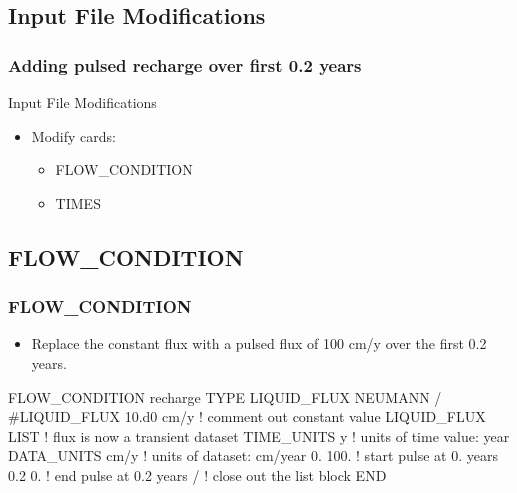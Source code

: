 \documentclass{beamer}
\newcommand\redcomment[1]{{{\color{red} #1}}}
\newcommand\bluecomment[1]{{{\color{blue} #1}}}
\newcommand\magentacomment[1]{{{\color{magenta} #1}}}
\begin{document}
\subsection{Input File Modifications}

\begin{frame}[fragile]\frametitle{Adding pulsed recharge over first 0.2 years}


Input File Modifications
\begin{itemize}
\item Modify cards:
  \begin{itemize}
    \item FLOW\_CONDITION
    \item TIMES
   \end{itemize}
\end{itemize}

\end{frame}

\subsection{FLOW\_CONDITION}

\begin{frame}[fragile]\frametitle{FLOW\_CONDITION}

\begin{itemize}
\item Replace the constant flux with a pulsed flux of 100 cm/y over the first 0.2 years.
\end{itemize}


\begin{semiverbatim}

FLOW_CONDITION recharge
  TYPE
    LIQUID_FLUX NEUMANN
  /
  \magentacomment{#}LIQUID_FLUX 10.d0 cm/y  \bluecomment{! comment out constant value}
  \magentacomment{LIQUID_FLUX LIST   \bluecomment{! flux is now a transient dataset}
    TIME_UNITS y     \bluecomment{! units of time value: \redcomment{year}}
    DATA_UNITS cm/y  \bluecomment{! units of dataset: \redcomment{cm/year}}
    0. 100.          \bluecomment{! start pulse at 0. years}
    0.2 0.           \bluecomment{! end pulse at 0.2 years}
  /}                  \bluecomment{! close out the list block}
END

\end{semiverbatim}

\end{frame}

\end{document}
